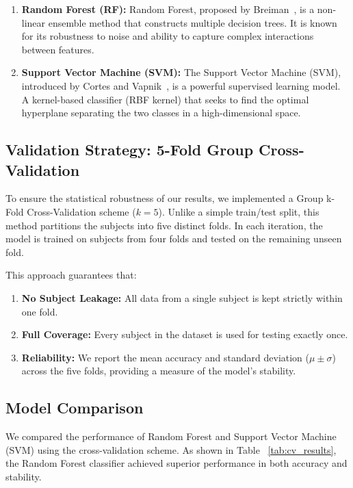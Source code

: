 \documentclass[11pt,a4paper]{article}
\begin{document}
\begin{enumerate}
    \item \textbf{Random Forest (RF):} Random Forest, proposed by Breiman~\cite{breiman2001random}, is a non-linear ensemble method that 
        constructs multiple decision trees. It is known for its robustness to noise and ability to capture complex interactions between 
        features.
    \item \textbf{Support Vector Machine (SVM):} The Support Vector Machine (SVM), introduced by Cortes and Vapnik~\cite{cortes1995support}, 
        is a powerful supervised learning model. A kernel-based classifier (RBF kernel) that seeks to find the optimal hyperplane separating 
        the two classes in a high-dimensional space.
\end{enumerate}

\subsection{Validation Strategy: 5-Fold Group Cross-Validation}
To ensure the statistical robustness of our results, we implemented a Group k-Fold Cross-Validation scheme ($k=5$). Unlike a simple 
train/test split, this method partitions the subjects into five distinct folds. In each iteration, the model is trained on subjects from four 
folds and tested on the remaining unseen fold.

This approach guarantees that:
\begin{enumerate}
    \item \textbf{No Subject Leakage:} All data from a single subject is kept strictly within one fold.
    \item \textbf{Full Coverage:} Every subject in the dataset is used for testing exactly once.
    \item \textbf{Reliability:} We report the mean accuracy and standard deviation ($\mu \pm \sigma$) across the five folds, providing a 
    measure of the model's stability.
\end{enumerate}

\subsection{Model Comparison}
We compared the performance of Random Forest and Support Vector Machine (SVM) using the cross-validation scheme. As shown in Table
~\ref{tab:cv_results}, the Random Forest classifier achieved superior performance in both accuracy and stability.
\end{document}
